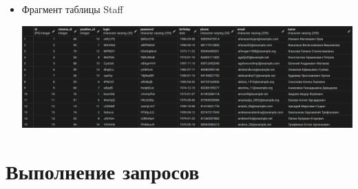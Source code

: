 \documentclass[a4paper,12pt]{article}
\renewcommand{\^}[2]{#1^{\, #2} \kern -1pt}
\newcommand{\1}{\kern 1pt}
\newcommand{\0}{\kern -1pt}
\begin{document}
\begin{itemize}
	
	\item Фрагмент таблицы Staff
	
	\includegraphics[scale=0.24,page=1]{table_inserts_examples/Staff}
	
	
		
	\end{itemize}
	
	\newpage
	
	\section{Выполнение запросов}\label{sec:-3}
\end{document}
